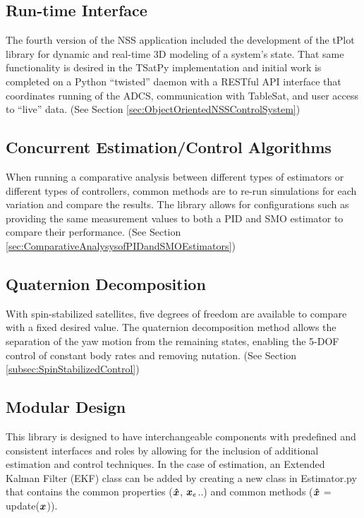\subsection{Run-time Interface}

The fourth version of the NSS application included the development of the tPlot library for dynamic and real-time 3D modeling of a system's state.  That same functionality is desired in the TSatPy implementation and initial work is completed on a Python ``twisted'' daemon with a RESTful API interface that coordinates running of the ADCS, communication with TableSat, and user access to ``live'' data.  (See Section \ref{sec:ObjectOrientedNSSControlSystem})

\subsection{Concurrent Estimation/Control Algorithms}

When running a comparative analysis between different types of estimators or different types of controllers, common methods are to re-run simulations for each variation and compare the results. The library allows for configurations such as providing the same measurement values to both a PID and SMO estimator to compare their performance. (See Section \ref{sec:ComparativeAnalysysofPIDandSMOEstimators})

\subsection{Quaternion Decomposition}

With spin-stabilized satellites, five degrees of freedom are available to compare with a fixed desired value.  The quaternion decomposition method allows the separation of the yaw motion from the remaining states, enabling the 5-DOF control of constant body rates and removing nutation. (See Section \ref{subsec:SpinStabilizedControl})

\subsection{Modular Design}

This library is designed to have interchangeable components with predefined and consistent interfaces and roles by allowing for the inclusion of additional estimation and control techniques. In the case of estimation, an Extended Kalman Filter (EKF) class can be added by creating a new class in Estimator.py that contains the common properties ($\boldsymbol{\hat{x}}$, $\boldsymbol{x}_e$..) and common methods ($\boldsymbol{\hat{x}}$ = update($\boldsymbol{x}$)).

